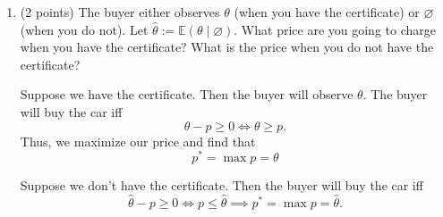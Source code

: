 \documentclass[11pt]{article}
\begin{document}
\begin{enumerate}[label=2.\arabic*.]
    \item (2 points) The buyer either observes $\theta$ (when you have the certificate) or $\varnothing$ (when you do not). Let $\hat{\theta} := \mathbb{E}(\theta \mid \varnothing)$. What price are you going to charge when you have the certificate? What is the price when you do not have the certificate?
\begin{solution}
    Suppose we have the certificate. Then the buyer will observe $\theta.$ The buyer will buy the car iff 
    \[\theta - p \geq 0 \iff \theta \geq p.\] Thus, we maximize our price and find that \[\boxed{p^* = \max p = \theta}\] 

    Suppose we don't have the certificate. Then the buyer will buy the car iff 
    \[\hat{\theta} - p \geq 0 \iff p \leq \hat{ \theta} \implies \boxed{p^* = \max p = \hat{\theta}}.\] 
\end{solution}



\end{enumerate}
\end{document}
